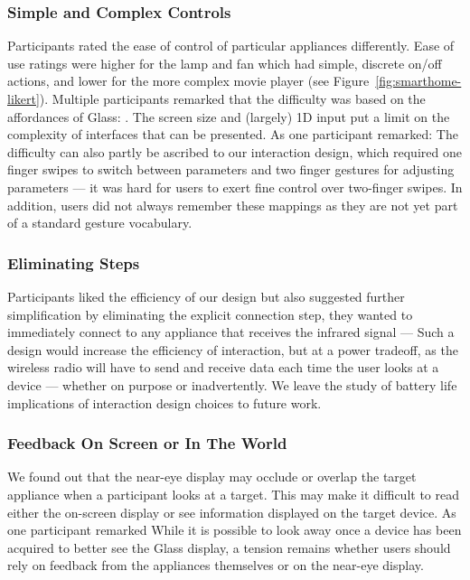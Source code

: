 \subsubsection{Simple and Complex Controls}
Participants rated the ease of control of particular appliances differently. Ease of use ratings were higher for the lamp and fan which had simple, discrete on/off actions, and lower for the more complex movie player (see Figure~\ref{fig:smarthome-likert}). Multiple participants remarked that the difficulty was based on the affordances of Glass: . The screen size and (largely) 1D input put a limit on the complexity of interfaces that can be presented. As one participant remarked:  The difficulty can also partly be ascribed to our interaction design, which required one finger swipes to switch between parameters and two finger gestures for adjusting parameters --- it was hard for users to exert fine control over two-finger swipes. In addition, users did not always remember these mappings as they are not yet part of a standard gesture vocabulary.

\subsubsection{Eliminating Steps}
Participants liked the efficiency of our design but also suggested further simplification by eliminating the explicit connection step, they wanted to immediately connect to any appliance that receives the infrared signal ---  Such a design would increase the efficiency of interaction, but at a power tradeoff, as the wireless radio will have to send and receive data each time the user looks at a device --- whether on purpose or inadvertently. We leave the study of battery life implications of interaction design choices to future work. 

\subsubsection{Feedback On Screen or In The World}
We found out that the near-eye display may occlude or overlap the target appliance when a participant looks at a target. This may make it difficult to read either the on-screen display or see information displayed on the target device.  As one participant remarked  While it is possible to look away once a device has been acquired to better see the Glass display, a tension remains whether users should rely on feedback from the appliances themselves or on the near-eye display.

